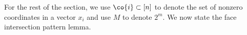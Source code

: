 

For the rest of the section, we use $\co{i}\subset [n]$ to denote the set of nonzero coordinates in a vector $x_i$ and use $M$ to denote \(2^m\). We now state the face intersection pattern lemma.
%


